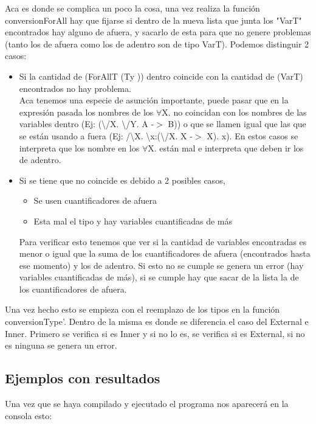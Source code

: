 \documentclass[12pt, titlepage, a4paper]{article}
\begin{document}
Aca es donde se complica un poco la cosa, una vez realiza la función conversionForAll hay que fijarse si dentro de la nueva lista que junta los "VarT" encontrados 
hay alguno de afuera, y sacarlo de esta para que no genere problemas (tanto los de afuera como los de adentro son de tipo VarT). 
Podemos distinguir 2 casos:

\begin{itemize}%
  \item {Si la cantidad de (ForAllT (Ty )) dentro coincide con la cantidad de (VarT) encontrados no hay problema. \\
  Aca tenemos una especie de asunción importante, puede pasar que en la expresión pasada 
  los nombres de los $\forall$X. no coincidan con los nombres de las variables dentro (Ej: 
  (\textbackslash/X. \textbackslash/Y. A -$>$ B)) o que se llamen igual que las que se están usando a fuera 
  (Ej: /\textbackslash X. \textbackslash x:(\textbackslash/X. X -$>$ X). x). 
  En estos casos se interpreta que los nombre en los $\forall$X. están mal e interpreta que deben ir los de adentro. 
  }

  \item {Si se tiene que no coincide es debido a 2 posibles casos, 
        \begin{itemize}
          \item {Se usen cuantificadores de afuera}
          \item {Esta mal el tipo y hay variables cuantificadas de más}
        \end{itemize}
  Para verificar esto tenemos que ver si la cantidad de variables encontradas es menor o igual que la suma de los cuantificadores de afuera 
  (encontrados hasta ese momento) y los de adentro. 
  Si esto no se cumple se genera un error (hay variables cuantificadas de más), si se cumple hay que sacar de la lista la de los cuantificadores de afuera.
  }
\end{itemize}

Una vez hecho esto se empieza con el reemplazo de los tipos en la función conversionType'.
Dentro de la misma es donde se diferencia el caso del External e Inner. 
Primero se verifica si es Inner y si no lo es, se verifica si es External, si no es ninguna se genera un error.

\subsection{Ejemplos con resultados}
Una vez que se haya compilado y ejecutado el programa nos aparecerá en la consola esto:
\end{document}
